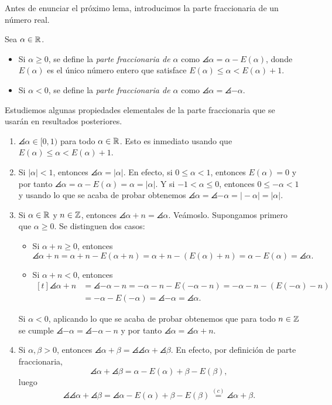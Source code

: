 \documentclass[a4paper, 12pt, oneside]{book}
\begin{document}
Antes de enunciar el próximo lema, introducimos la parte fraccionaria de un número real.

\begin{definition}
    Sea $\alpha \in \mathbb R$.
    \begin{itemize}
        \item Si $\alpha \geq 0$, se define la \emph{parte fraccionaria de $\alpha$} como $\angles{\alpha} = \alpha - E(\alpha)$, donde $E(\alpha)$ es el único número entero que satisface $E(\alpha) \leq \alpha < E(\alpha)+1$.
        \item Si $\alpha < 0$, se define la \emph{parte fraccionaria de $\alpha$} como $\angles{\alpha} = \angles{-\alpha}$.
    \end{itemize} 
\end{definition}

Estudiemos algunas propiedades elementales de la parte fraccionaria que se usarán en resultados posteriores.

\begin{enumerate}
    \item $\angles{\alpha} \in [0,1)$ para todo $\alpha\in\mathbb R$. Esto es inmediato usando que $E(\alpha) \leq \alpha < E(\alpha)+1$.
    \item Si $|\alpha| < 1$, entonces $\angles{\alpha}=|\alpha| $. En efecto, si $0 \leq \alpha < 1$, entonces $E(\alpha) = 0$ y por tanto $\angles{\alpha} = \alpha - E(\alpha) = \alpha = |\alpha|$. Y si $-1 < \alpha \leq 0$, entonces $0\leq -\alpha < 1$ y usando lo que se acaba de probar obtenemos $\angles{\alpha} = \angles{-\alpha} = |\!-\alpha| = |\alpha|$.
    \item Si $\alpha\in\mathbb R$ y $n \in \mathbb Z$, entonces $\angles{\alpha+n} = \angles{\alpha}$. Veámoslo. Supongamos primero que $\alpha \geq 0$. Se distinguen dos casos:
    \begin{itemize}
        \item Si $\alpha+n \geq 0$, entonces
        \[\angles{\alpha+n} = \alpha+n-E(\alpha+n) = \alpha+n-(E(\alpha)+n) = \alpha-E(\alpha) = \angles{\alpha}.\]
        \item Si $\alpha+n < 0$, entonces
        \[
        \begin{aligned}[t]
            \angles{\alpha+n} &= \angles{-\alpha-n} = -\alpha-n-E(-\alpha-n) = -\alpha-n-(E(-\alpha)-n) \\ &= -\alpha-E(-\alpha) = \angles{-\alpha} = \angles{\alpha}.
        \end{aligned}
        \]
    \end{itemize}
    Si $\alpha < 0$, aplicando lo que se acaba de probar obtenemos que para todo $n \in \mathbb Z$ se cumple $\angles{-\alpha} = \angles{-\alpha-n}$ y por tanto $\angles{\alpha} = \angles{\alpha+n}$.
    \item Si $\alpha,\beta > 0$, entonces $\angles{\alpha+\beta} = \angles{\angles{\alpha}+\angles{\beta}}$. En efecto, por definición de parte fraccionaria,
    \[\angles{\alpha}+\angles{\beta} = \alpha-E(\alpha)+\beta-E(\beta),\]
    luego
    \[\angles{\angles{\alpha}+\angles{\beta}} = \angles{\alpha-E(\alpha)+\beta-E(\beta)} \overset{(c)}{=} \angles{\alpha+\beta}.\]
\end{enumerate}
\end{document}
